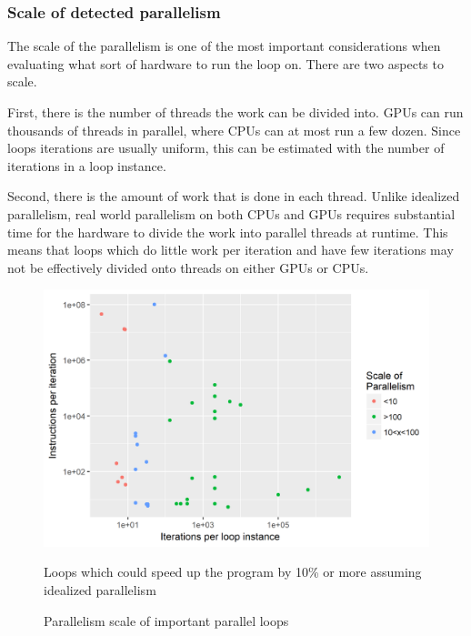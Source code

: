 \documentclass[12pt,twoside]{reedthesis}
\begin{document}
		\subsubsection{Scale of detected parallelism}
		
		The scale of the parallelism is one of the most important considerations when evaluating what sort of hardware to run the loop on. There are two aspects to scale. 
		
		First, there is the number of threads the work can be divided into. GPUs can run thousands of threads in parallel, where CPUs can at most run a few dozen. Since loops iterations are usually uniform, this can be estimated with the number of iterations in a loop instance. 
		
		Second, there is the amount of work that is done in each thread. Unlike idealized parallelism, real world parallelism on both CPUs and GPUs requires substantial time for the hardware to divide the work into parallel threads at runtime. This means that loops which do little work per iteration and have few iterations may not be effectively divided onto threads on either GPUs or CPUs. 
		
		\begin{figure}
			\caption{Parallelism scale of important parallel loops}
			\label{fig:paralleism-scale}
			
			\begin{minipage}{0.6\textwidth} %
				\includegraphics[scale=0.7]{plots/categorized_conflicts.png}
				{\footnotesize Loops which could speed up the program by 10\% or more assuming idealized parallelism \par}
			\end{minipage}
		\end{figure}
		
\end{document}
